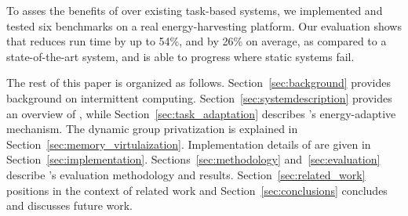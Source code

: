 To asses the benefits of \sys over existing task-based systems, we implemented and tested six
benchmarks on a real energy-harvesting platform.
Our evaluation shows that \sys reduces run time by up to 54\%, and by 26\% on average, as compared to a state-of-the-art system, and is able to progress where static systems fail.
 
The rest of this paper is organized as follows. Section~\ref{sec:background} provides background on intermittent computing.
Section~\ref{sec:systemdescription} provides an overview of \sys, while
Section~\ref{sec:task_adaptation} describes \sys's energy-adaptive mechanism. The dynamic group privatization is explained in Section~\ref{sec:memory_virtulaization}. Implementation details of \sys are given in Section~\ref{sec:implementation}. Sections~\ref{sec:methodology} and~\ref{sec:evaluation} describe \sys's evaluation methodology and results. Section~\ref{sec:related_work} positions \sys in the
context of related work and Section~\ref{sec:conclusions} concludes and discusses
future work.

